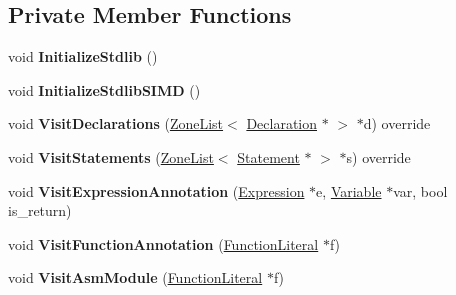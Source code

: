 \subsection*{Private Member Functions}
\begin{DoxyCompactItemize}
\item 
void {\bfseries Initialize\+Stdlib} ()\hypertarget{classv8_1_1internal_1_1_asm_typer_a500a706e249be88e5bd3b5185c7c6624}{}\label{classv8_1_1internal_1_1_asm_typer_a500a706e249be88e5bd3b5185c7c6624}

\item 
void {\bfseries Initialize\+Stdlib\+S\+I\+MD} ()\hypertarget{classv8_1_1internal_1_1_asm_typer_a1b783ba4c59fd4ab88e92a536cd4bc15}{}\label{classv8_1_1internal_1_1_asm_typer_a1b783ba4c59fd4ab88e92a536cd4bc15}

\item 
void {\bfseries Visit\+Declarations} (\hyperlink{classv8_1_1internal_1_1_zone_list}{Zone\+List}$<$ \hyperlink{classv8_1_1internal_1_1_declaration}{Declaration} $\ast$ $>$ $\ast$d) override\hypertarget{classv8_1_1internal_1_1_asm_typer_a8a1842b9db8264f6f3066e3bf84f540b}{}\label{classv8_1_1internal_1_1_asm_typer_a8a1842b9db8264f6f3066e3bf84f540b}

\item 
void {\bfseries Visit\+Statements} (\hyperlink{classv8_1_1internal_1_1_zone_list}{Zone\+List}$<$ \hyperlink{classv8_1_1internal_1_1_statement}{Statement} $\ast$ $>$ $\ast$s) override\hypertarget{classv8_1_1internal_1_1_asm_typer_a69192e4565cced885cad607cbd65b934}{}\label{classv8_1_1internal_1_1_asm_typer_a69192e4565cced885cad607cbd65b934}

\item 
void {\bfseries Visit\+Expression\+Annotation} (\hyperlink{classv8_1_1internal_1_1_expression}{Expression} $\ast$e, \hyperlink{classv8_1_1internal_1_1_variable}{Variable} $\ast$var, bool is\+\_\+return)\hypertarget{classv8_1_1internal_1_1_asm_typer_a80c161308dead8a61b7abc7227fc3cb3}{}\label{classv8_1_1internal_1_1_asm_typer_a80c161308dead8a61b7abc7227fc3cb3}

\item 
void {\bfseries Visit\+Function\+Annotation} (\hyperlink{classv8_1_1internal_1_1_function_literal}{Function\+Literal} $\ast$f)\hypertarget{classv8_1_1internal_1_1_asm_typer_a97012c7d415782694e17293c02d67ba8}{}\label{classv8_1_1internal_1_1_asm_typer_a97012c7d415782694e17293c02d67ba8}

\item 
void {\bfseries Visit\+Asm\+Module} (\hyperlink{classv8_1_1internal_1_1_function_literal}{Function\+Literal} $\ast$f)\hypertarget{classv8_1_1internal_1_1_asm_typer_ac990ea428a84a56eb06733986f554bc7}{}\label{classv8_1_1internal_1_1_asm_typer_ac990ea428a84a56eb06733986f554bc7}


\end{DoxyCompactItemize}
